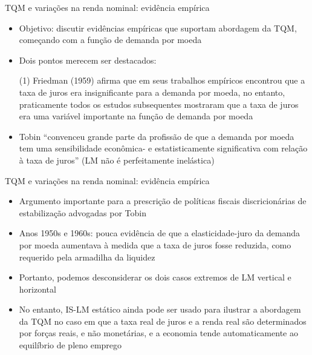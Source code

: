 \documentclass[10pt]{beamer}
\begin{document}
\begin{frame}{TQM e variações na renda nominal: evidência empírica}
    \begin{itemize}
        \item Objetivo: discutir evidências empíricas que suportam abordagem da TQM, começando com a função de demanda por moeda
        \bigskip
        \item Dois pontos merecem ser destacados:
        \bigskip
        \item[(1)] Friedman (1959) afirma que em seus trabalhos empíricos encontrou que a taxa de juros era insignificante para a demanda por moeda, no entanto, praticamente todos os estudos subsequentes mostraram que a taxa de juros era uma variável importante na função de demanda por moeda
        \bigskip
        \item Tobin ``convenceu grande parte da profissão de que a demanda por moeda tem uma sensibilidade econômica- e estatisticamente significativa com relação à taxa de juros'' (LM não é perfeitamente inelástica)
    \end{itemize}
\end{frame}

\begin{frame}{TQM e variações na renda nominal: evidência empírica}
    \begin{itemize}
        \item Argumento importante para a prescrição de políticas fiscais discricionárias de estabilização advogadas por Tobin
        \bigskip
        \item Anos 1950s e 1960s: pouca evidência de que a elasticidade-juro da demanda por moeda aumentava à medida que a taxa de juros fosse reduzida, como requerido pela armadilha da liquidez
        \bigskip
        \item Portanto, podemos desconsiderar os dois casos extremos de LM vertical e horizontal
        \bigskip
        \item No entanto, IS-LM estático ainda pode ser usado para ilustrar a abordagem da TQM no caso em que a taxa real de juros e a renda real são determinados por forças reais, e não monetárias, e a economia tende automaticamente ao equilíbrio de pleno emprego
    \end{itemize}
\end{frame}
\end{document}
